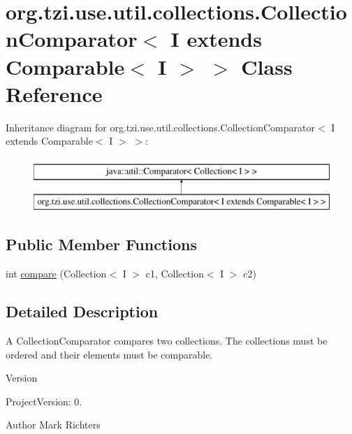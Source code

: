 \hypertarget{classorg_1_1tzi_1_1use_1_1util_1_1collections_1_1_collection_comparator_3_01_i_01extends_01_comparable_3_01_i_01_4_01_4}{\section{org.\-tzi.\-use.\-util.\-collections.\-Collection\-Comparator$<$ I extends Comparable$<$ I $>$ $>$ Class Reference}
\label{classorg_1_1tzi_1_1use_1_1util_1_1collections_1_1_collection_comparator_3_01_i_01extends_01_comparable_3_01_i_01_4_01_4}
}
Inheritance diagram for org.\-tzi.\-use.\-util.\-collections.\-Collection\-Comparator$<$ I extends Comparable$<$ I $>$ $>$\-:\begin{figure}[H]
\begin{center}
\leavevmode
\includegraphics[height=2.000000cm]{classorg_1_1tzi_1_1use_1_1util_1_1collections_1_1_collection_comparator_3_01_i_01extends_01_comparable_3_01_i_01_4_01_4}
\end{center}
\end{figure}
\subsection*{Public Member Functions}
\begin{DoxyCompactItemize}
\item 
int \hyperlink{classorg_1_1tzi_1_1use_1_1util_1_1collections_1_1_collection_comparator_3_01_i_01extends_01_comparable_3_01_i_01_4_01_4_abf9c45a181350e85730b627d5d9a452c}{compare} (Collection$<$ I $>$ c1, Collection$<$ I $>$ c2)
\end{DoxyCompactItemize}


\subsection{Detailed Description}
A Collection\-Comparator compares two collections. The collections must be ordered and their elements must be comparable.

\begin{DoxyVersion}{Version}

\end{DoxyVersion}
\begin{DoxyParagraph}{Project\-Version\-:}
0. 
\end{DoxyParagraph}
\begin{DoxyAuthor}{Author}
Mark Richters 
\end{DoxyAuthor}


